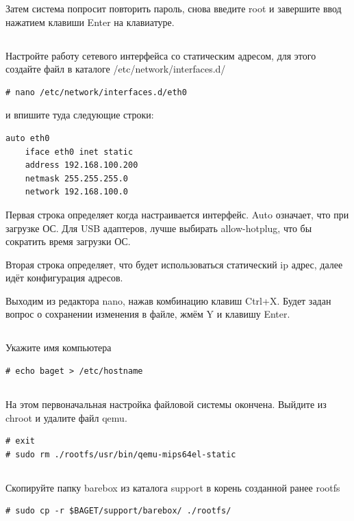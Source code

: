 Затем система попросит повторить пароль, снова введите root и завершите ввод нажатием клавиши Enter на клавиатуре.

\subsection{}Настройте работу сетевого интерфейса со статическим адресом, для этого создайте файл в каталоге /etc/network/interfaces.d/

\begin{lstlisting}[style=bash]
# nano /etc/network/interfaces.d/eth0
\end{lstlisting}
и впишите туда следующие строки:

\begin{lstlisting}[style=stdout]
auto eth0
	iface eth0 inet static
	address 192.168.100.200
	netmask 255.255.255.0
	network 192.168.100.0
\end{lstlisting}

Первая строка определяет когда настраивается интерфейс. Auto означает, что при загрузке ОС. 
Для USB адаптеров, лучше выбирать allow-hotplug, что бы сократить время загрузки ОС. 

Вторая строка определяет, что будет использоваться статический ip адрес, 
далее идёт конфигурация адресов.

Выходим из редактора nano, нажав комбинацию клавиш Ctrl+X. Будет задан вопрос о сохранении изменения в файле, жмём Y и клавишу Enter.

\subsection{}Укажите имя компьютера

\begin{lstlisting}[style=bash]
# echo baget > /etc/hostname
\end{lstlisting}

\subsection{}На этом первоначальная настройка файловой системы окончена. Выйдите из chroot и удалите файл qemu. 

\begin{lstlisting}[style=bash]
# exit
# sudo rm ./rootfs/usr/bin/qemu-mips64el-static
\end{lstlisting}

\subsection{}Скопируйте папку barebox из каталога support в корень созданной ранее rootfs
\begin{lstlisting}[style=bash]
# sudo cp -r $BAGET/support/barebox/ ./rootfs/
\end{lstlisting}

